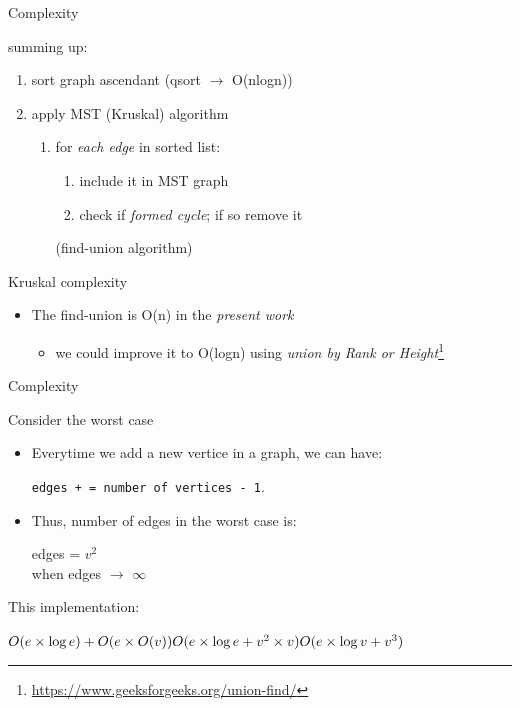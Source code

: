 \documentclass[presentation]{beamer}
\begin{document}
\begin{frame}[label={sec:orgheadline11}]{Complexity}
\begin{block}{summing up:}
\begin{enumerate}
\item sort graph ascendant (qsort \(\to\) O(nlogn))
\item apply MST (Kruskal) algorithm
\begin{enumerate}
\item for \emph{each edge} in sorted list:
\begin{enumerate}
\item include it in MST graph
\item check if \emph{formed cycle}; if so remove it
\end{enumerate}
(find-union algorithm)
\end{enumerate}
\end{enumerate}
\end{block}
\begin{block}{Kruskal complexity}
\begin{itemize}
\item The find-union is O(n) in the \emph{present work}
\begin{itemize}
\item we could improve it to O(logn) using \emph{union by Rank or Height}\footnote{\url{https://www.geeksforgeeks.org/union-find/}}
\end{itemize}
\end{itemize}
\end{block}
\end{frame}
\begin{frame}[fragile,label={sec:orgheadline12}]{Complexity}
 \begin{block}{Consider the worst case}
\begin{itemize}
\item Everytime we add a new vertice in a graph, we can have:

\begin{center}
\texttt{edges + = number of vertices - 1}. 
\end{center}

\item Thus, number of edges in the worst case is:

\begin{center}
edges = \(v^{2}\) \\
when edges \(\to\) \(\infty\)
\end{center}
\end{itemize}
\end{block}


\begin{block}{This implementation:}
\begin{center}

\(O(e \times \log{e}) + O(e  \times O(v)) \\
    O(e \times \log{e} + v^{2} \times v) \\
    O(e \times \log{v} + v^{3}) \\\)
\end{center}
\end{block}
\end{frame}
\end{document}
